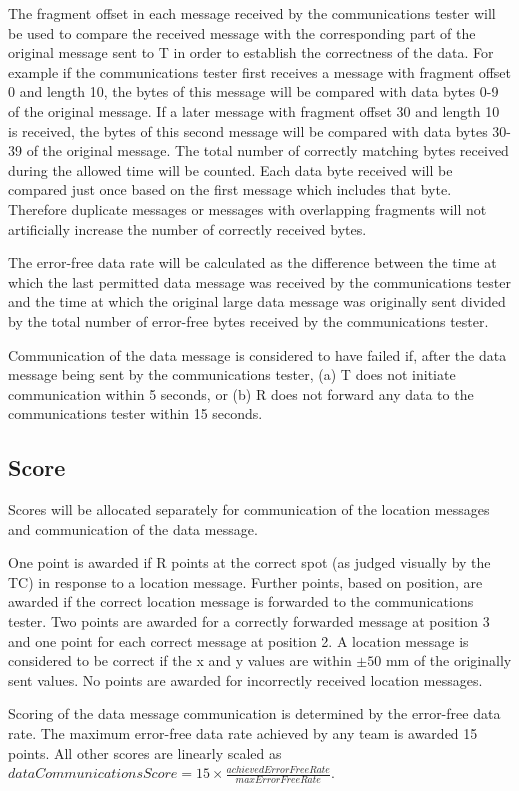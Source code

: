 \documentclass[12pt]{article}
\begin{document}
The fragment offset in each message received by the communications tester will be used to compare the received message with the corresponding part of the original message sent to T in order to establish the correctness of the data. For example if the communications tester first receives a message with fragment offset 0 and length 10, the bytes of this message will be compared with data bytes 0-9 of the original message. If a later message with fragment offset 30 and length 10 is received, the bytes of this second message will be compared with data bytes 30-39 of the original message. The total number of correctly matching bytes received during the allowed time
will be counted. Each data byte received will be compared just once based on the first message which includes that byte. Therefore duplicate messages or messages with overlapping fragments will not artificially increase the number of correctly received bytes.

The error-free data rate will be calculated as the difference between the time at which the last permitted data message was received by the communications tester and the time at which the original large data message was originally sent divided by the total number of error-free bytes received by the communications tester.

Communication of the data message is considered to have failed if, after the data message being sent by the communications tester, (a) T does not initiate communication within 5 seconds, or (b) R does not forward any data to the communications tester within 15 seconds.

\subsection{Score}
Scores will be allocated separately for communication of the location messages and communication of the data message.

One point is awarded if R points at the correct spot (as judged visually by the TC) in response to a location message. Further points, based on position, are awarded if the correct location message is forwarded to the communications tester. Two points are awarded for a correctly forwarded message at position 3 and one point for each correct message at position 2. A location message is considered to be correct if the x and y values are within $\pm50$ mm of the originally sent values. No points are awarded for incorrectly received location messages.

Scoring of the data message communication is determined by the error-free data rate. The maximum error-free data rate achieved by any team is awarded 15 points. All other scores are linearly scaled as $dataCommunicationsScore = 15 \times \frac{achievedErrorFreeRate}{maxErrorFreeRate}$. 
\end{document}
